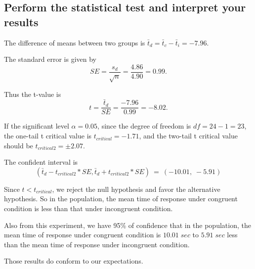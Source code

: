 \documentclass[paper=a4, fontsize=11pt]{scrartcl} %
\numberwithin{equation}{section} %
\numberwithin{figure}{section} %
\numberwithin{table}{section} %
\begin{document}
\subsection{Perform the statistical test and interpret your results}
\medskip
\noindent{}
\medskip

The difference of means between two groups
is $\bar{t}_d = \bar{t}_c-\bar{t}_i = -7.96$.

The standard error is given by
\begin{equation}
    SE = \frac{s_d}{\sqrt{n}} = \frac{4.86}{4.90} = 0.99.
\end{equation}

Thus the t-value is
\begin{equation}
    t = \frac{\bar{t}_d}{SE} = \frac{-7.96}{0.99} = -8.02.
\end{equation}

If the significant level $\alpha = 0.05$, since the degree of
freedom is $df = 24-1 = 23$, the one-tail t critical value is
$t_{critical} = -1.71$, and the two-tail t critical value should be 
$t_{critical2} = \pm 2.07$.

The confident interval is 
\begin{equation}
    (\bar{t}_d - t_{critical2} * SE,
    \bar{t}_d + t_{critical2} * SE)
    \ = \ (-10.01, \; -5.91)
\end{equation}

Since $t < t_{critical}$, we reject the null hypothesis and
favor the alternative hypothesis.
So in the population, the mean time of response under
congruent condition is less than
that under incongruent condition.

Also from this experiment, we have 95\% of confidence that in the
population, the mean time of response under congruent condition is
$10.01 \; sec$ to $5.91 \; sec$ less than the mean time
of response under incongruent condition.

Those results do conform to our expectations.
\end{document}

